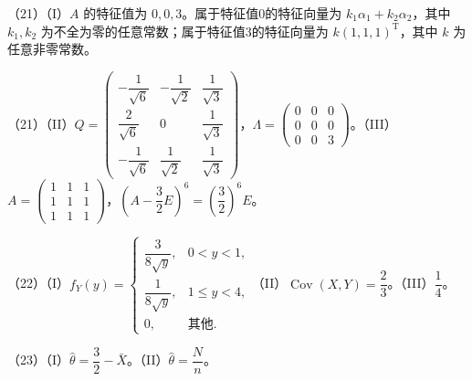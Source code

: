 \documentclass[UTF8,12pt]{ctexart}
\begin{document}
（21）（I）\(\displaystyle A\) 的特征值为 \(\displaystyle 0,\allowbreak 0,\allowbreak 3\)。属于特征值0的特征向量为 \(\displaystyle k_1\alpha_1+k_2\alpha_2\)，其中 \(\displaystyle k_1,\allowbreak k_2\) 为不全为零的任意常数；属于特征值3的特征向量为 \(\displaystyle k(1,\allowbreak 1,\allowbreak 1)^{\mathrm T}\)，其中 \(\displaystyle k\) 为任意非零常数。


（21）（II）\(\displaystyle Q=\begin{pmatrix}-\dfrac{\displaystyle 1}{\displaystyle \sqrt6}&-\dfrac{\displaystyle 1}{\displaystyle \sqrt2}&\dfrac{\displaystyle 1}{\displaystyle \sqrt3}\\\dfrac{\displaystyle 2}{\displaystyle \sqrt6}&0&\dfrac{\displaystyle 1}{\displaystyle \sqrt3}\\-\dfrac{\displaystyle 1}{\displaystyle \sqrt6}&\dfrac{\displaystyle 1}{\displaystyle \sqrt2}&\dfrac{\displaystyle 1}{\displaystyle \sqrt3}\end{pmatrix}\)，\(\displaystyle \Lambda=\begin{pmatrix}0&0&0\\0&0&0\\0&0&3\end{pmatrix}\)。（III）\(\displaystyle A=\begin{pmatrix}1&1&1\\1&1&1\\1&1&1\end{pmatrix}\)，\(\displaystyle (A-\dfrac{\displaystyle 3}{\displaystyle 2}E)^6=(\dfrac{\displaystyle 3}{\displaystyle 2})^6E\)。


（22）（I）\(\displaystyle f_Y(y)=\begin{cases}\dfrac{\displaystyle 3}{\displaystyle 8\sqrt y},\allowbreak &0<y<1,\allowbreak \\\dfrac{\displaystyle 1}{\displaystyle 8\sqrt y},\allowbreak &1\le y<4,\allowbreak \\0,\allowbreak &\text{其他}.\end{cases}\)（II）\(\displaystyle \operatorname{Cov}(X,\allowbreak Y)=\dfrac{\displaystyle 2}{\displaystyle 3}\)。（III）\(\displaystyle \dfrac{\displaystyle 1}{\displaystyle 4}\)。


（23）（I）\(\displaystyle \hat\theta=\dfrac{\displaystyle 3}{\displaystyle 2}-\bar X\)。（II）\(\displaystyle \hat\theta=\dfrac{\displaystyle N}{\displaystyle n}\)。
\end{document}
